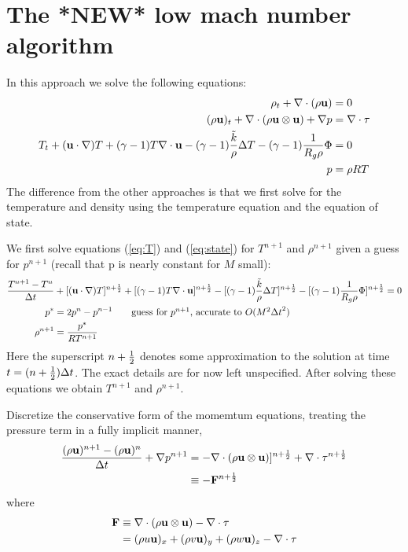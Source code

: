 \documentclass{article}
\begin{document}
\clearpage
\section{The *NEW* low mach number algorithm}


In this approach we solve the following equations:
\begin{align}
   \rho_t + \nabla\cdot( \rho{\bf u} ) &= 0 \label{eq:rho} \\
   (\rho{\bf u})_t + \nabla\cdot( \rho {\bf u}\otimes {\bf u} ) + \nabla p & = \nabla\cdot {\bf \tau} \label{eq:u} \\
   T_t + ({\bf u}\cdot\nabla) T +(\gamma-1) T \nabla\cdot{\bf u}
       - (\gamma-1) { \tilde{k} \over \rho } \Delta T
       - (\gamma-1) { 1 \over R_g \rho } \Phi & = 0                 \label{eq:T}  \\
   p &= \rho R T \label{eq:state}
\end{align}
The difference from the other approaches is that we first solve for the temperature and density
using the temperature equation and the equation of state.


We first solve equations (\ref{eq:T}) and (\ref{eq:state}) for $T^{n+1}$ and $\rho^{n+1}$
given a guess for $p^{n+1}$ (recall that p is nearly constant for $M$ small):
\begin{align*}
{T^{n+1} - T^n \over \Delta t} &+ [({\bf u}\cdot\nabla) T]^{n+{1\over2}} + [(\gamma-1)T \nabla\cdot{\bf u}]^{n+{1\over2}}
       - [(\gamma-1) { \tilde{k} \over \rho } \Delta T]^{n+{1\over2}}
       - [(\gamma-1) { 1 \over R_g \rho } \Phi]^{n+{1\over2}} = 0                  \\
   p^* &= 2 p^n - p^{n-1} \qquad\mbox{guess for $p^{n+1}$, accurate to $O(M^2 {\Delta t}^2)$} \\
   \rho^{n+1} &=  { p^* \over R T^{n+1} }
\end{align*}
Here the superscript $n+{1\over2}$ denotes some approximation to the solution at time $t=(n+{1\over2}){\Delta t}$. The
exact details are for now left unspecified.
After solving these equations we obtain $T^{n+1}$ and $\rho^{n+1}$. 

Discretize the conservative form of the momemtum equations, treating the pressure term in a fully
implicit manner,
\begin{align}
  {(\rho{\bf u})^{n+1} - (\rho{\bf u})^{n} \over {\Delta t}}+ \nabla p^{n+1} 
         &= - \nabla\cdot( \rho {\bf u}\otimes {\bf u} )]^{n+{1\over2}} +
              \nabla\cdot {\bf \tau}^{n+{1\over2}}  \\
                          &\equiv -{\bf F}^{n+{1\over2}} \label{eq:ut} \\
\end{align}
where
\begin{align}
       {\bf F} &\equiv \nabla\cdot( \rho {\bf u}\otimes {\bf u} ) -  \nabla\cdot {\bf \tau} \\
             &= (\rho u {\bf u} )_x + (\rho v {\bf u})_y + (\rho w {\bf u} )_z - \nabla\cdot{\bf \tau}
\end{align}
\end{document}
